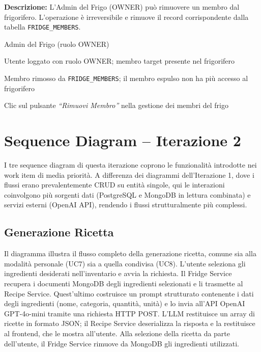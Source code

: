 \documentclass[12pt,a4paper,twoside]{report}
\newenvironment{ucbox}{%
  \begin{mdframed}[
    backgroundcolor=ucbg,
    linecolor=ucborder,
    linewidth=1pt,
    innerleftmargin=10pt,
    innerrightmargin=10pt,
    innertopmargin=8pt,
    innerbottommargin=8pt,
    roundcorner=4pt
  ]
}{%
  \end{mdframed}
}
\begin{document}
\begin{ucbox}
\textbf{Descrizione:} L'Admin del Frigo (OWNER) può rimuovere un membro dal frigorifero. L'operazione è irreversibile e rimuove il record corrispondente dalla tabella \texttt{FRIDGE\_MEMBERS}.

\begin{description}[leftmargin=4cm, style=sameline]
  \item[Attori Coinvolti:] Admin del Frigo (ruolo OWNER)
  \item[Precondizione:] Utente loggato con ruolo OWNER; membro target presente nel frigorifero
  \item[Postcondizione:] Membro rimosso da \texttt{FRIDGE\_MEMBERS}; il membro espulso non ha più accesso al frigorifero
  \item[Trigger:] Clic sul pulsante \textit{``Rimuovi Membro''} nella gestione dei membri del frigo
\end{description}
\end{ucbox}

\newpage
\section{Sequence Diagram -- Iterazione 2}

I tre sequence diagram di questa iterazione coprono le funzionalità introdotte nei work item di media priorità. A differenza dei diagrammi dell'Iterazione 1, dove i flussi erano prevalentemente CRUD su entità singole, qui le interazioni coinvolgono più sorgenti dati (PostgreSQL e MongoDB in lettura combinata) e servizi esterni (OpenAI API), rendendo i flussi strutturalmente più complessi.

\subsection{Generazione Ricetta}

Il diagramma illustra il flusso completo della generazione ricetta, comune sia alla modalità personale (UC7) sia a quella condivisa (UC8). L'utente seleziona gli ingredienti desiderati nell'inventario e avvia la richiesta. Il Fridge Service recupera i documenti MongoDB degli ingredienti selezionati e li trasmette al Recipe Service. Quest'ultimo costruisce un prompt strutturato contenente i dati degli ingredienti (nome, categoria, quantità, unità) e lo invia all'API OpenAI GPT-4o-mini tramite una richiesta HTTP POST. L'LLM restituisce un array di ricette in formato JSON; il Recipe Service deserializza la risposta e la restituisce al frontend, che le mostra all'utente. Alla selezione della ricetta da parte dell'utente, il Fridge Service rimuove da MongoDB gli ingredienti utilizzati.
\end{document}
